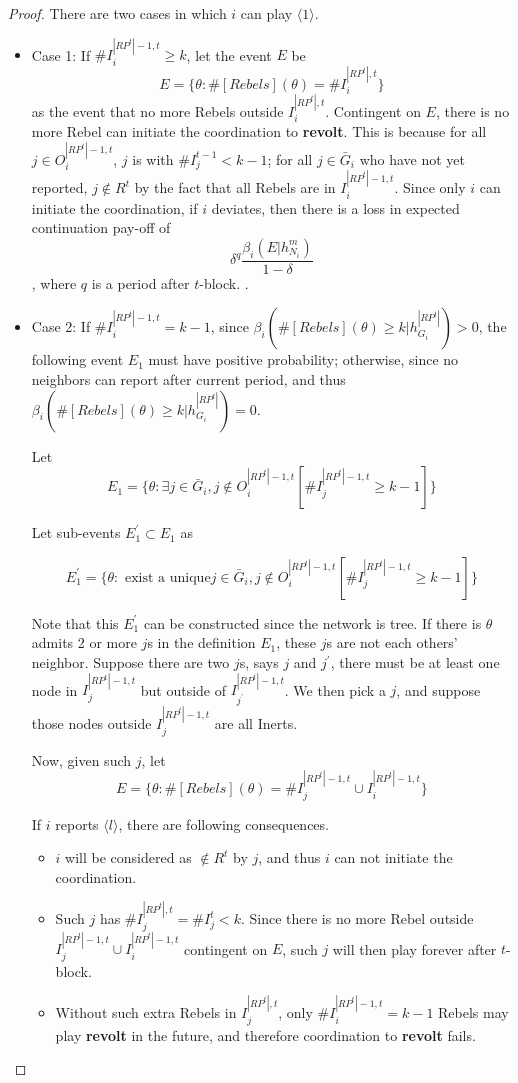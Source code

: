 \documentclass[12pt,letterpaper]{article}
\newtheorem*{main result}{Main Result}
\theoremstyle{definition}
\theoremstyle{remark}
\theoremstyle{claim}
\begin{document}
\begin{proof}

There are two cases in which $i$ can play $\langle 1 \rangle$.
\begin{itemize}

\item Case 1: If $\#I^{|RP^t|-1,t}_i\geq k$, let the event $E$ be
\[E=\{\theta: \#[Rebels](\theta)=\# I^{|RP^t|,t}_i\}\]
as the event that no more Rebels outside $ I^{|RP^t|,t}_i$. Contingent on $E$, there is no more Rebel can initiate the coordination to \textbf{revolt}. This is because for all $j\in O^{|RP^t|-1,t}_i$, $j$ is with $\# I^{t-1}_j< k-1$; for all $j\in \bar{G}_i$ who have not yet reported, $j\not\in R^t$ by the fact that all Rebels are in $I^{|RP^t|-1,t}_i$. Since only $i$ can initiate the coordination, if $i$ deviates, then there is a loss in expected continuation pay-off of
\[\delta^q\frac{\beta_{i}(E|h^{m}_{N_i})}{1-\delta}\], where $q$ is a period after $t$-block.
.

\item Case 2: If $\#I^{|RP^t|-1,t}_i= k-1$, since $\beta_{i}(\#[Rebels](\theta)\geq k|h^{|RP^t|}_{G_i})>0$, the following event $E_1$ must have positive probability; otherwise, since no neighbors can report after current period, and thus $\beta_{i}(\#[Rebels](\theta)\geq k|h^{|RP^t|}_{G_i})=0$.

Let
\[E_1=\{\theta: \exists j\in \bar{G}_i, j\notin O^{|RP^t|-1,t}_i [\#I^{|RP^t|-1,t}_j\geq k-1]\}\]


Let sub-events $E^{'}_1\subset E_1$ as

\[E^{'}_1=\{\theta: \text{ exist a unique} j\in \bar{G}_i, j\notin O^{|RP^t|-1,t}_i [\#I^{|RP^t|-1,t}_j\geq k-1]\}\] 

Note that this $E^{'}_1$ can be constructed since the network is tree. If there is $\theta$ admits 2 or more $j$s in the definition $E_1$, these $j$s are not each others' neighbor. Suppose there are two $j$s, says $j$ and $j^{'}$, there must be at least one node in $I^{|RP^t|-1,t}_j$ but outside of $I^{|RP^t|-1,t}_{j^{'}}$. We then pick a $j$, and suppose those nodes outside $I^{|RP^t|-1,t}_j$ are all Inerts.

Now, given such $j$, let
\[E=\{\theta:\#[Rebels](\theta)=\#I^{|RP^t|-1,t}_j\cup I^{|RP^t|-1,t}_i\}\]

If $i$ reports $\langle l \rangle$, there are following consequences.

\begin{itemize}
\item $i$ will be considered as $\notin R^t$ by $j$, and thus $i$ can not initiate the coordination.
\item Such $j$ has $\#I^{|RP^t|,t}_j=\#I^t_j<k$. Since there is no more Rebel outside $I^{|RP^t|-1,t}_j\cup I^{|RP^t|-1,t}_i$ contingent on $E$, such $j$ will then play  forever after $t$-block.
\item Without such extra Rebels in $I^{|RP^t|,t}_j$, only $\#I^{|RP^t|-1,t}_i= k-1$ Rebels may play \textbf{revolt} in the future, and therefore coordination to \textbf{revolt} fails.
\end{itemize}


\end{itemize}
\end{proof}
\end{document}
